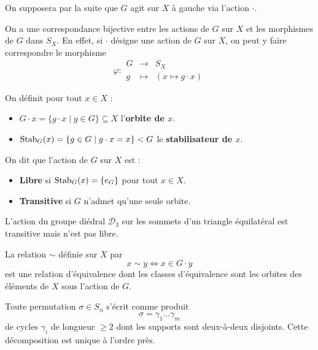   On supposera par la suite que $G$ agit sur $X$ à gauche via l'action $\cdot$.

  \begin{theorem}
    On a une correspondance bijective entre les actions de $G$ sur $X$ et les morphismes de $G$ dans $S_X$. En effet, si $\cdot$ désigne une action de $G$ sur $X$, on peut y faire correspondre le morphisme
    \[ \varphi :
    \begin{array}{ccc}
      G &\rightarrow& S_X \\
      g &\mapsto& (x \mapsto g \cdot x)
    \end{array}
    \]
  \end{theorem}

  \begin{definition}
    On définit pour tout $x \in X$ :
    \begin{itemize}
      \item $G \cdot x = \{ g \cdot x \mid g \in G \} \subseteq X$ l'\textbf{orbite de $x$}.
      \item $\operatorname{Stab}_G(x) = \{ g \in G \mid g \cdot x = x \} < G$ le \textbf{stabilisateur de $x$}.
    \end{itemize}
    On dit que l'action de $G$ sur $X$ est :
    \begin{itemize}
      \item \textbf{Libre} si $\operatorname{Stab}_G(x) = \{ e_G \}$ pour tout $x \in X$.
      \item \textbf{Transitive} si $G$ n'admet qu'une seule orbite.
    \end{itemize}
  \end{definition}

  \begin{example}
    L'action du groupe diédral $\mathcal{D}_3$ sur les sommets d'un triangle équilatéral est transitive mais n'est pas libre.
  \end{example}

  \begin{proposition}
    \label{101-1}
    La relation $\sim$ définie sur $X$ par
    \[ x \sim y \iff x \in G \cdot y \]
    est une relation d'équivalence dont les classes d'équivalence sont les orbites des éléments de $X$ sous l'action de $G$.
  \end{proposition}


  \begin{application}
    Toute permutation $\sigma \in S_n$ s'écrit comme produit
    \[ \sigma = \gamma_1 \dots \gamma_m \]
    de cycles $\gamma_i$ de longueur $\geq 2$ dont les supports sont deux-à-deux disjoints. Cette décomposition est unique à l'ordre près.
  \end{application}


